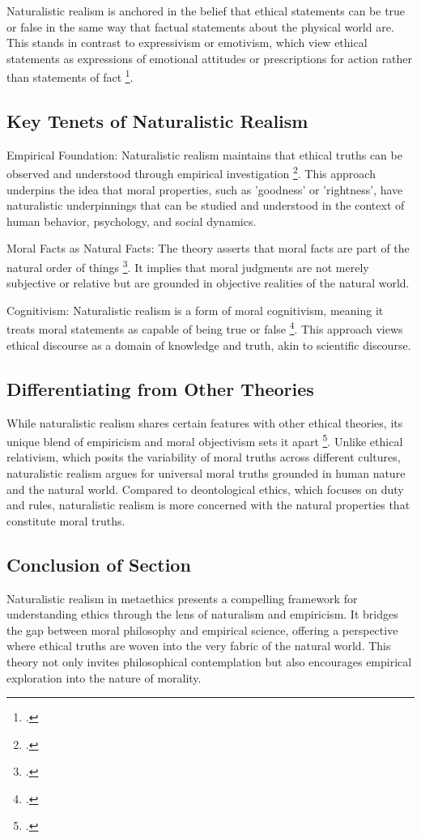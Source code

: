 \documentclass[12pt,a4paper]{article}
\begin{document}
Naturalistic realism is anchored in the belief that ethical statements can be true or false in the same way that factual statements about the physical world are. This stands in contrast to expressivism or emotivism, which view ethical statements as expressions of emotional attitudes or prescriptions for action rather than statements of fact \footcite[570-572]{FinlayCuneo2008}. 

\subsection{Key Tenets of Naturalistic Realism}
Empirical Foundation: Naturalistic realism maintains that ethical truths can be observed and understood through empirical investigation \footcite[339-362]{Stringer2018}. This approach underpins the idea that moral properties, such as 'goodness' or 'rightness', have naturalistic underpinnings that can be studied and understood in the context of human behavior, psychology, and social dynamics.

Moral Facts as Natural Facts: The theory asserts that moral facts are part of the natural order of things \footcite[154-176]{Brink2001}. It implies that moral judgments are not merely subjective or relative but are grounded in objective realities of the natural world.

Cognitivism: Naturalistic realism is a form of moral cognitivism, meaning it treats moral statements as capable of being true or false \footcite[]{McPherson2012}. This approach views ethical discourse as a domain of knowledge and truth, akin to scientific discourse.

\subsection{Differentiating from Other Theories}
While naturalistic realism shares certain features with other ethical theories, its unique blend of empiricism and moral objectivism sets it apart \footcite[471-490]{Arruda2018}. Unlike ethical relativism, which posits the variability of moral truths across different cultures, naturalistic realism argues for universal moral truths grounded in human nature and the natural world. Compared to deontological ethics, which focuses on duty and rules, naturalistic realism is more concerned with the natural properties that constitute moral truths.

\subsection{Conclusion of Section}
Naturalistic realism in metaethics presents a compelling framework for understanding ethics through the lens of naturalism and empiricism. It bridges the gap between moral philosophy and empirical science, offering a perspective where ethical truths are woven into the very fabric of the natural world. This theory not only invites philosophical contemplation but also encourages empirical exploration into the nature of morality.
\end{document}
